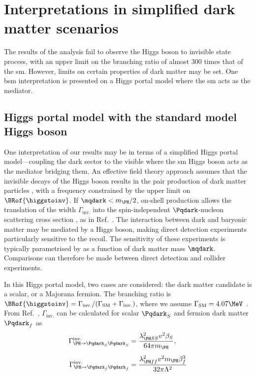 \section{Interpretations in simplified dark matter scenarios}
\label{sec:htoinv_dark_matter_models}

The results of the analysis fail to observe the Higgs boson to invisible state process, with an upper limit on the branching ratio of almost 300 times that of the \acrlong{sm}. However, limits on certain properties of dark matter may be set. One \acrshort{bsm} interpretation is presented on a Higgs portal model where the \acrshort{sm} acts as the mediator.




\subsection{Higgs portal model with the standard model Higgs boson}
\label{subsec:htoinv_dark_matter_higgs_portal}

One interpretation of our results may be in terms of a simplified Higgs portal model---coupling the dark sector to the visible where the \acrshort{sm} Higgs boson acts as the mediator bridging them. An effective field theory approach assumes that the invisible decays of the Higgs boson results in the pair production of dark matter particles \Pqdark, with a frequency constrained by the upper limit on $\BRof{\higgstoinv}$. If $\mqdark < m_{\PH}/\text{2}$, on-shell production allows the translation of the \higgstoinv width $\Gamma_{\mathrm{inv.}}$ into the spin-independent $\Pqdark$-nucleon scattering cross section \xsecSI, as in Ref.~. The interaction between dark and baryonic matter may be mediated by a Higgs boson, making direct detection experiments particularly sensitive to the recoil. The sensitivity of these experiments is typically parametrised by \xsecSI as a function of dark matter mass $\mqdark$. Comparisons can therefore be made between direct detection and collider experiments.

In this Higgs portal model, two cases are considered: the dark matter candidate is a scalar, or a Majorana fermion. The branching ratio is $\BRof{\higgstoinv} = \Gamma_{\mathrm{inv.}}/(\Gamma_{\mathrm{SM}} + \Gamma_{\mathrm{inv.}})$, where we assume $\Gamma_{\mathrm{SM}} = \text{4.07}\MeV$~\cite{Heinemeyer:1559921}. From Ref.~, $\Gamma_{\mathrm{inv.}}$ can be calculated for scalar $\Pqdark_{S}$ and fermion dark matter $\Pqdark_{f}$ as
\begin{equation}
    \begin{aligned}
\Gamma^{\mathrm{inv.}}_{\PH \rightarrow \Pqdark_{S}\Pqdark_{S}} &= \frac{ \lambda^2_{\PH SS} v^2 \beta_S }{64\pi m_{\PH}},\\[0.5em]
\Gamma^{\mathrm{inv.}}_{\PH \rightarrow \Pqdark_{f}\Pqdark_{f}} &= \frac{ \lambda^2_{\PH ff} v^2 m_{\PH} \beta_f^3 }{ 32\pi \Lambda^2 }
    \end{aligned}
\end{equation}

